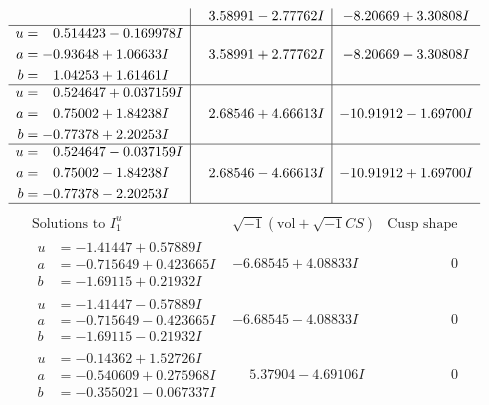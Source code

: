 \documentclass[1p]{elsarticle_modified}
\theoremstyle{definition}
\newcommand{\I}{\sqrt{-1}}
\begin{document}
$$\begin{array}{c|c|c}
 & \phantom{-}3.58991 - 2.77762 I & -8.20669 + 3.30808 I \\ \hline\begin{aligned}
u &= \phantom{-}0.514423 - 0.169978 I \\
a &= -0.93648 + 1.06633 I \\
b &= \phantom{-}1.04253 + 1.61461 I\end{aligned}
 & \phantom{-}3.58991 + 2.77762 I & -8.20669 - 3.30808 I \\ \hline\begin{aligned}
u &= \phantom{-}0.524647 + 0.037159 I \\
a &= \phantom{-}0.75002 + 1.84238 I \\
b &= -0.77378 + 2.20253 I\end{aligned}
 & \phantom{-}2.68546 + 4.66613 I & -10.91912 - 1.69700 I \\ \hline\begin{aligned}
u &= \phantom{-}0.524647 - 0.037159 I \\
a &= \phantom{-}0.75002 - 1.84238 I \\
b &= -0.77378 - 2.20253 I\end{aligned}
 & \phantom{-}2.68546 - 4.66613 I & -10.91912 + 1.69700 I\\
 \hline 
 \end{array}$$\newpage$$\begin{array}{c|c|c}  
\text{Solutions to }I^u_{1}& \I (\text{vol} + \sqrt{-1}CS) & \text{Cusp shape}\\
 \hline 
\begin{aligned}
u &= -1.41447 + 0.57889 I \\
a &= -0.715649 + 0.423665 I \\
b &= -1.69115 + 0.21932 I\end{aligned}
 & -6.68545 + 4.08833 I & \phantom{-0.000000 } 0 \\ \hline\begin{aligned}
u &= -1.41447 - 0.57889 I \\
a &= -0.715649 - 0.423665 I \\
b &= -1.69115 - 0.21932 I\end{aligned}
 & -6.68545 - 4.08833 I & \phantom{-0.000000 } 0 \\ \hline\begin{aligned}
u &= -0.14362 + 1.52726 I \\
a &= -0.540609 + 0.275968 I \\
b &= -0.355021 - 0.067337 I\end{aligned}
 & \phantom{-}5.37904 - 4.69106 I & \phantom{-0.000000 } 0 \\ \hline\begin{aligned}

\end{aligned}
\end{array}$$
\end{document}
